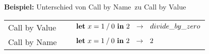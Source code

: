 {
  {\bf Beispiel:} Unterschied von \glqq Call by Name\grqq\ zu \glqq Call by Value\grqq\\[5mm]
  \begin{tabular}{ll}
     Call by Value $\quad$      & $\bli{x}{\infix{/}{1}{0}}{2} \ \ \to \ \ divide\_by\_zero$ \\[3mm]
     Call by Name $\quad$       & $\bli{x}{\infix{/}{1}{0}}{2} \ \ \to \ \ 2$ \\[3mm]
  \end{tabular}
}